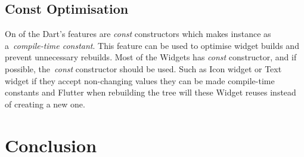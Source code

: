\subsection{Const Optimisation}
On of the Dart's features are \textit{const} constructors which makes instance as a~\textit{compile-time constant}. This feature can be used to optimise widget builds and prevent unnecessary rebuilds. Most of the Widgets has \textit{const} constructor, and if possible, the~\textit{const} constructor should be used. Such as Icon widget or Text widget if they accept non-changing values they can be made compile-time constants and Flutter when rebuilding the tree will these Widget reuses instead of creating a new one. 

\section{Conclusion}


